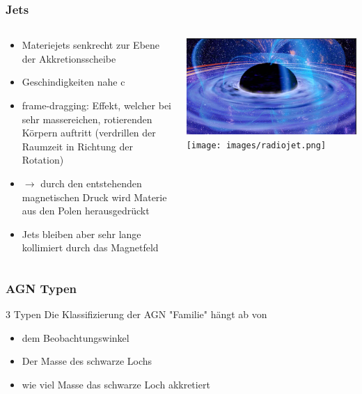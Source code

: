 \documentclass[aspectratio=1610, 9pt]{beamer}
\begin{document}
\begin{frame}\frametitle{Jets}
  \begin{columns}
  \begin{column}[c]{0.45\linewidth}
    \begin{itemize}
      \item Materiejets senkrecht zur Ebene der Akkretionsscheibe
      \item Geschindigkeiten nahe c
      \item frame-dragging: Effekt, welcher bei sehr massereichen, rotierenden K\"orpern auftritt (verdrillen der Raumzeit in Richtung der Rotation)
      \item $\to$ durch den entstehenden magnetischen Druck wird Materie aus den Polen herausgedr\"uckt
      \item Jets bleiben aber sehr lange kollimiert durch das Magnetfeld
    \end{itemize}
  \end{column}
  \begin{column}{0.45\linewidth}
    \includegraphics{images/magnetfeld.png}
    \texttt{[image: images/radiojet.png]}
  \end{column}
  \end{columns}
\end{frame}

\begin{frame}\frametitle{AGN Typen}
  \begin{block}{3 Typen}
    Die Klassifizierung der AGN "Familie" h\"angt ab von
    \begin{itemize}
      \item dem Beobachtungswinkel
      \item Der Masse des schwarze Lochs
      \item wie viel Masse das schwarze Loch akkretiert
    \end{itemize}
  \end{block}
\end{frame}
\end{document}
